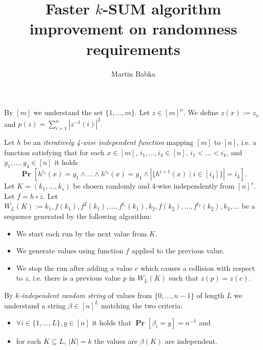 \documentclass{article}
\title{Faster $k$-SUM algorithm improvement on randomness requirements}
\author{Martin Babka}
\newcommand{\probs}[2]{\operatorname{\mathbf{Pr}}_{{#1}}\left[{#2}\right]}
\newcommand{\prob}[1]{\probs{}{#1}}
\begin{document}
\maketitle

By $[m]$ we understand the set $\{1, \dots, m\}$.
Let $z \in [m]^n$. 
We define $z(x) := z_x$ and $p(z) = \sum_{i = 1}^{n} |z^{-1}(i)|^2$.

Let $h$ be an \emph{iteratively 4-wise independent function} mapping $[m]$ to $[n]$, i.e. a function satisfying that for each $x \in [m]$, $i_1, \dots, i_4 \in [n]$, $i_1 < \dots < i_4$, and $y_1, \dots, y_4 \in [n]$ it holds \[\prob{h^{i_1}(x)=y_1 \wedge \dots \wedge h^{i_4}(x)=y_4 \wedge \left|\{h^{i + 1}(x) \mid i \in [i_4]\}\right| = i_4}.\] 
Let $K = (k_1, \dots, k_s)$ be chosen randomly and 4-wise independently from $[n]^s$.
Let $f = h \circ z$.
Let $W_L(K) := k_1, f(k_1), f^2(k_1), \dots, f^{l_1}(k_1), k_2, f(k_2), \dots, f^{l_2}(k_2), k_3, \dots$ be a sequence generated by the following algorithm:
\begin{itemize}
    \item We start each run by the next value from $K$.
    \item We generate values using function $f$ applied to the previous value.
    \item We stop the run after adding a value $c$ which causes a collision with respect to $z$, i.e. there is a previous value $p$ in $W_L(K)$ such that $z(p) = z(c)$.
\end{itemize}

By \emph{$k$-independent random string} of values from $\{0, \dots, n - 1\}$ of length $L$  we understand a string $\beta \in [n]^L$ matching the two criteria: 
\begin{itemize}
    \item $\forall i \in \{1, \dots, L\}, y \in [n]$ it holds that $\prob{\beta_i = y} = n^{-1}$ and
    \item for each $K \subseteq L$, $|K| = k$ the values are $\beta(K)$ are independent.
\end{itemize}
\end{document}
